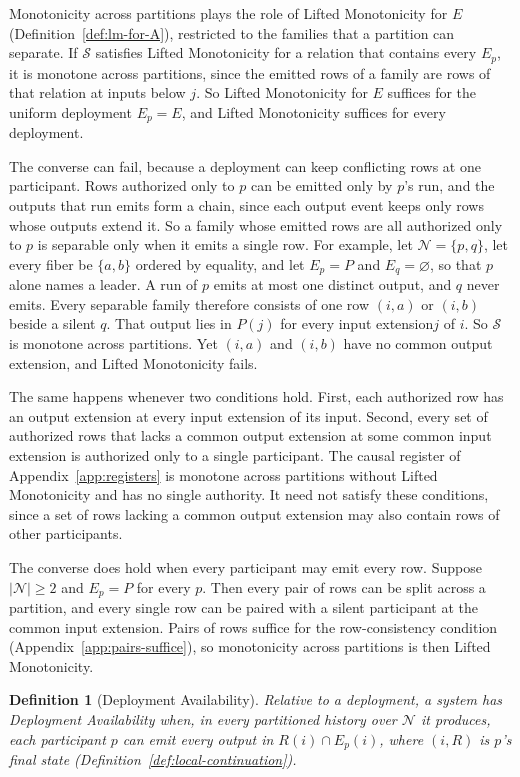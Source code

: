 \documentclass[sigconf]{cidr-2027}
\newtheorem{definition}{Definition}
\theoremstyle{remark}
\newcommand{\indesc}{input extension\xspace} %
\newcommand{\outnoun}{output extension\xspace}%
\newcommand{\Spec}{\mathcal{S}}
\newcommand{\fiber}[1]{P(#1)}
\begin{document}
Monotonicity across partitions plays the role of Lifted Monotonicity for $E$
(Definition~\ref{def:lm-for-A}), restricted to the families that a partition
can separate. If $\Spec$ satisfies Lifted Monotonicity for a relation that
contains every $E_p$, it is monotone across partitions, since the emitted rows
of a family are rows of that relation at inputs below $j$. So Lifted
Monotonicity for $E$ suffices for the uniform deployment $E_p=E$, and Lifted
Monotonicity suffices for every deployment.

The converse can fail, because a deployment can keep conflicting rows at one
participant. Rows authorized only to $p$ can be emitted only by $p$'s run,
and the outputs that run emits form a chain, since each output event keeps
only rows whose outputs extend it. So a family whose emitted rows are all
authorized only to $p$ is separable only when it emits a single row. For
example, let $\mathcal N=\{p,q\}$, let every fiber be $\{a,b\}$ ordered by
equality, and let $E_p=P$ and $E_q=\varnothing$, so that $p$ alone names a
leader. A run of $p$ emits at most one distinct output, and $q$ never emits. Every separable family therefore consists of one row $(i,a)$ or $(i,b)$ beside
a silent $q$. That output lies in $\fiber{j}$ for every \indesc $j$ of $i$. So $\Spec$ is monotone across partitions. Yet $(i,a)$ and $(i,b)$ have no
common \outnoun, and Lifted Monotonicity fails.

The same happens whenever two conditions hold. First, each authorized row has
an \outnoun at every \indesc of its input. Second, every set of authorized
rows that lacks a common \outnoun at some common \indesc is authorized only to
a single participant. The causal register of Appendix~\ref{app:registers} is
monotone across partitions without Lifted Monotonicity and has no single
authority. It need not satisfy these conditions, since a set of rows lacking
a common \outnoun may also contain rows of other participants.

The converse does hold when every participant may emit every row. Suppose
$|\mathcal N|\ge2$ and $E_p=P$ for every $p$. Then every pair of rows can be
split across a partition, and every single row can be paired with a silent
participant at the common \indesc. Pairs of rows suffice for the
row-consistency condition (Appendix~\ref{app:pairs-suffice}), so
monotonicity across partitions is then Lifted Monotonicity.

\begin{definition}[Deployment Availability]
\label{def:deployment-availability}
Relative to a deployment, a system has \emph{Deployment Availability} when, in
every partitioned history over $\mathcal N$ it produces, each participant $p$
can emit every output in $R(i)\cap E_p(i)$, where $(i,R)$ is $p$'s final state
(Definition~\ref{def:local-continuation}).
\end{definition}
\end{document}
